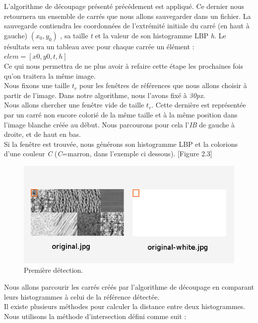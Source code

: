 \indent L'algorithme de découpage présenté précédement est appliqué. Ce dernier nous retournera un ensemble de carrés que nous allons sauvegarder dans un fichier. La sauvegarde contiendra les coordonnées de l’extrémité initiale du carré (en haut à gauche) $(x_0,y_0)$ , sa taille \textit{t} et la valeur de son histogramme LBP \textit{h}. Le résultats sera un tableau  avec pour chaque carrée un élément : $elem = [x0,y0,t,h]$\\

\indent Ce qui nous permettra de ne plus avoir à refaire cette étape les prochaines fois qu'on traitera la même image.\\
\indent Nous fixons une taille $t_r$ pour les fenêtres de références que nous allons choisir à partir de l'image. Dans notre algorithme, nous l'avons fixé à \textit{30px}.\\
\indent Nous allons chercher une fenêtre vide de taille $t_r$. Cette dernière est représentée par un carré non encore colorié de la même taille et à la même position dans l'image blanche créée au début. Nous parcourons pour cela l'\textit{IB} de gauche à droite, et de haut en bas.\\
Si la fenêtre est trouvée, nous générons son histogramme LBP et la colorions d'une couleur \textit{C} (\textit{C}=marron, dans l'exemple ci dessous). [Figure 2.3]

\begin{figure}[H]
	\centering
		\includegraphics[width=14cm,]{Figures/chap2/3.png}
		
	\caption[detection1]{Première détection.}
	\label{fig:division}
\end{figure}

Nous allons parcourir les carrés créés par l'algorithme de découpage en comparant leurs histogrammes à celui de la référence détectée. \\

Il existe plusieurs méthodes pour calculer la distance entre deux histogrammes. Nous utilisons la méthode d'intersection défini comme  suit :\\

